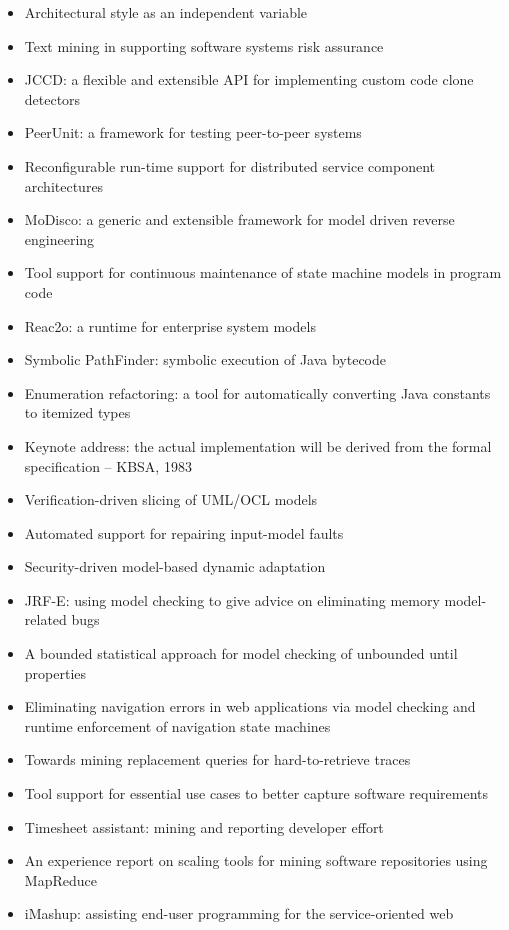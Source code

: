 {\begin{itemize}[itemsep=-1ex]
  \item Architectural style as an independent variable
  \item Text mining in supporting software systems risk assurance
  \item JCCD: a flexible and extensible API for implementing custom code clone detectors
  \item PeerUnit: a framework for testing peer-to-peer systems
  \item Reconfigurable run-time support for distributed service component architectures
  \item MoDisco: a generic and extensible framework for model driven reverse engineering
  \item Tool support for continuous maintenance of state machine models in program code
  \item Reac2o: a runtime for enterprise system models
  \item Symbolic PathFinder: symbolic execution of Java bytecode
  \item Enumeration refactoring: a tool for automatically converting Java constants to itemized types
  \item Keynote address: the actual implementation will be derived from the formal specification -- KBSA, 1983
  \item Verification-driven slicing of UML/OCL models
  \item Automated support for repairing input-model faults
  \item Security-driven model-based dynamic adaptation
  \item JRF-E: using model checking to give advice on eliminating memory model-related bugs
  \item A bounded statistical approach for model checking of unbounded until properties
  \item Eliminating navigation errors in web applications via model checking and runtime enforcement of navigation state machines
  \item Towards mining replacement queries for hard-to-retrieve traces
  \item Tool support for essential use cases to better capture software requirements
  \item Timesheet assistant: mining and reporting developer effort
  \item An experience report on scaling tools for mining software repositories using MapReduce
  \item iMashup: assisting end-user programming for the service-oriented web

\end{itemize}}
